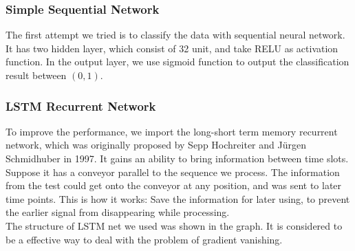\documentclass{article}
\begin{document}
\subsubsection{Simple Sequential Network}
The first attempt we tried is to classify the data with sequential neural network. It has two hidden layer, which consist of 32 unit, and take RELU as activation function. In the output layer, we use sigmoid function to output the classification result between $(0,1)$.
\subsubsection{LSTM Recurrent Network}
To improve the performance, we import the long-short term memory recurrent network, which was originally proposed by Sepp Hochreiter and Jürgen Schmidhuber in 1997. It gains an ability to bring information between time slots. Suppose it has a conveyor parallel to the sequence we process. The information from the test could get onto the conveyor at any position, and was sent to later time points. This is how it works: Save the information for later using, to prevent the earlier signal from disappearing while processing.\\
The structure of LSTM net we used was shown in the graph. It is considered to be a effective way to deal with the problem of gradient vanishing.
\end{document}
